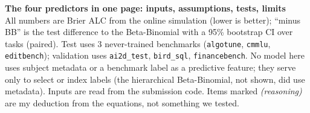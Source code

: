 \documentclass[10pt]{extarticle}
\newcommand{\code}[1]{\texttt{#1}}
\newcommand{\reasoning}{\textcolor{red!60!black}{\emph{(reasoning)}}}
\begin{document}
\sffamily
{\large\bfseries The four predictors in one page: inputs, assumptions, tests, limits}\\[2pt]
{\footnotesize All numbers are Brier ALC from the online simulation (lower is better); ``minus BB'' is the test difference to the Beta-Binomial with a 95\% bootstrap CI over tasks (paired). Test uses 3 never-trained benchmarks (\code{algotune}, \code{cmmlu}, \code{editbench}); validation uses \code{ai2d\_test}, \code{bird\_sql}, \code{financebench}. No model here uses subject metadata or a benchmark label as a predictive feature; they serve only to select or index labels (the hierarchical Beta-Binomial, not shown, did use metadata). Inputs are read from the submission code. Items marked \reasoning{} are my deduction from the equations, not something we tested.}\\[3pt]
\footnotesize
\renewcommand{\arraystretch}{1.08}
\setlength{\tabcolsep}{3pt}
\end{document}
